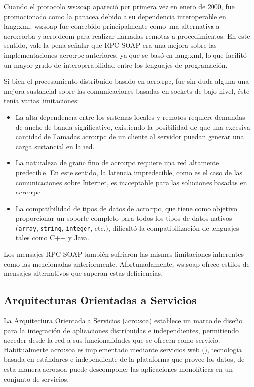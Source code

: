 Cuando el protocolo \gls{ws:soap} apareció por primera vez en enero de 2000, fue promocionado como la panacea debido a su dependencia interoperable en \gls{lang:xml}. \gls{ws:soap} fue concebido principalmente como una alternativa a \gls{acro:corba} y \gls{acro:dcom} para realizar llamadas remotas a procedimientos. En este sentido, vale la pena señalar que RPC SOAP era una mejora sobre las implementaciones \gls{acro:rpc} anteriores, ya que se basó en \gls{lang:xml}, lo que facilitó un mayor grado de interoperabilidad entre los lenguajes de programación.

Si bien el procesamiento distribuido basado en \gls{acro:rpc}, fue sin duda alguna una mejora sustancial sobre las comunicaciones basadas en sockets de bajo nivel, éste tenía varias limitaciones\cite[p.~6]{opensourcesoa:davis}:

\begin{itemize}
  \item La alta dependencia entre los sistemas locales y remotos requiere demandas de ancho de banda significativo, existiendo la posibilidad de que una excesiva cantidad de llamadas \gls{acro:rpc} de un cliente al servidor puedan generar una carga sustancial en la red.
  \item La naturaleza de grano fino de \gls{acro:rpc} requiere una red altamente predecible. En este sentido, la latencia impredecible, como es el caso de las comunicaciones sobre Internet, es inaceptable para las soluciones basadas en \gls{acro:rpc}.
  \item La compatibilidad de tipos de datos de \gls{acro:rpc}, que tiene como objetivo proporcionar un soporte completo para todos los tipos de datos nativos (\texttt{array}, \texttt{string}, \texttt{integer}, etc.), dificultó la compatibilización de lenguajes tales como C++ y Java.
\end{itemize}

Los mensajes RPC SOAP también sufrieron las mismas limitaciones inherentes como las mencionadas anteriormente. Afortunadamente, \gls{ws:soap} ofrece estilos de mensajes alternativos que superan estas deficiencias.

\subsection{Arquitecturas Orientadas a Servicios}
\label{soa:definicion}

La Arquitectura Orientada a Servicios (\gls{acro:soa}) establece un marco de diseño para la integración de aplicaciones distribuidas e independientes, permitiendo acceder desde la red a sus funcionalidades que se ofrecen como servicio. Habitualmente \gls{acro:soa} es implementado mediante servicios web (), tecnología basada en estándares e independiente de la plataforma que provee los datos, de esta manera \gls{acro:soa} puede descomponer las aplicaciones monolíticas en un conjunto de servicios\cite{microsoft2006}.

